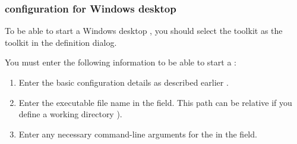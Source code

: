 

\subsubsection{\gdaut{} configuration for Windows desktop \gdauts{}}
To be able to start a Windows desktop \gdaut{}, you should select the  toolkit as the \gdaut{} toolkit in the \gdaut{} definition dialog. 

You must enter the following information to be able to start a  \gdaut{}:
\begin{enumerate}
\item Enter the basic configuration details as described earlier .
\item Enter the executable file name in the  field. This path can be relative if you define a working directory ).
\item Enter any necessary command-line arguments for the \gdaut{} in the
  field. 
  
\end{enumerate}
